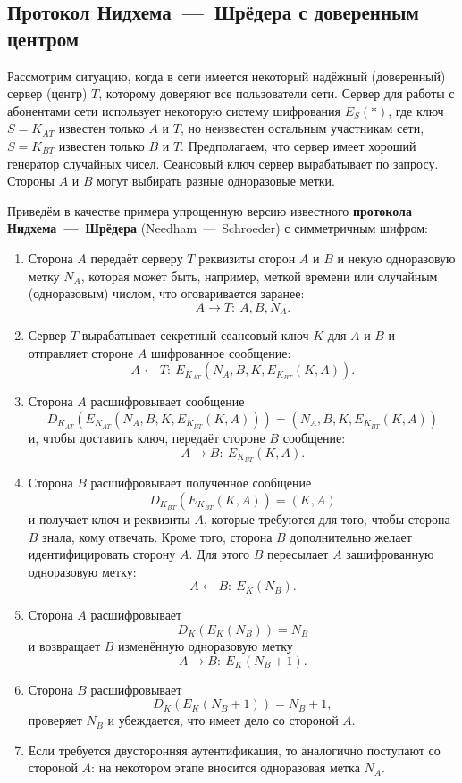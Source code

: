 \subsection{Протокол Нидхема~---~Шрёдера с доверенным центром}

Рассмотрим ситуацию, когда в сети имеется некоторый надёжный (доверенный) сервер (центр) $T$, которому доверяют все пользователи сети. Сервер для работы с абонентами сети использует некоторую систему шифрования $E_S(*)$, где ключ $S=K_{AT}$  известен только $A$ и $T$, но неизвестен остальным участникам сети, $S = K_{BT}$ известен только $B$ и  $T$. Предполагаем, что сервер имеет хороший генератор случайных чисел. Сеансовый ключ сервер вырабатывает по запросу. Стороны $A$ и $B$ могут выбирать разные одноразовые метки.

Приведём в качестве примера упрощенную версию известного \textbf{протокола Нидхема~---~Шрёдера} (Needham~---~Schroeder) с симметричным шифром:
\begin{enumerate}
    \item Сторона $A$ передаёт серверу $T$ реквизиты сторон $A$ и $B$  и некую одноразовую метку $N_A$, которая может быть, например, меткой времени или случайным (одноразовым) числом, что оговаривается заранее:
            \[ A \rightarrow T: ~ A, B, N_A. \]
    \item Сервер $T$ вырабатывает секретный сеансовый ключ $K$ для $A$ и $B$ и отправляет стороне $A$ шифрованное сообщение:
            \[ A \leftarrow T: ~ E_{K_{AT}}(N_A, B, K, E_{K_{BT}}(K, A)). \]
    \item Сторона $A$ расшифровывает сообщение
            \[ D_{K_{AT}}( E_{K_{AT}}(N_A, B, K, E_{K_{BT}}(K, A))) = (N_A, B, K, E_{K_{BT}}(K, A)) \]
        и, чтобы доставить ключ, передаёт стороне $B$ сообщение:
            \[ A \rightarrow B: ~ E_{K_{BT}}(K, A). \]
    \item Сторона $B$ расшифровывает полученное сообщение
            \[ D_{K_{BT}}( E_{K_{BT}}( K,A)) = (K,A) \]
        и получает ключ и реквизиты $A$, которые требуются для того, чтобы сторона $B$ знала, кому отвечать. Кроме того, сторона $B$ дополнительно желает идентифицировать сторону $A$. Для этого $B$ пересылает $A$ зашифрованную одноразовую метку:
            \[ A \leftarrow B: ~ E_{K}(N_B). \]
    \item Сторона $A$ расшифровывает
            \[ D_K( E_K( N_B)) = N_B \]
        и возвращает $B$ изменённую одноразовую метку
            \[ A \rightarrow B: ~ E_K(N_B + 1). \]
    \item Сторона $B$ расшифровывает
            \[ D_K( E_K( N_B + 1)) = N_B + 1, \]
        проверяет $N_B$ и убеждается, что имеет дело со стороной $A$.
    \item Если требуется двусторонняя аутентификация, то аналогично поступают со стороной $A$: на некотором этапе вносится одноразовая метка $N_A$.
\end{enumerate}
